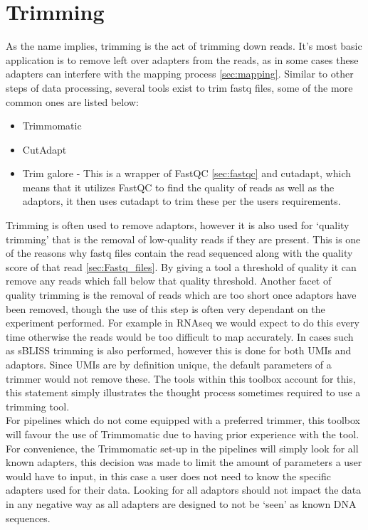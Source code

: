 \label{chap:tools}

\section{Trimming \label{sec:trimming}}
As the name implies, trimming is the act of trimming down reads. It's most basic application is to remove left over adapters from the reads, as in some cases these adapters can interfere with the mapping process \autoref{sec:mapping}. Similar to other steps of data processing, several tools exist to trim fastq files, some of the more common ones are listed below:\\
\begin{itemize}
\item Trimmomatic \cite{bolger2014trimmomatic}
\item CutAdapt \cite{martin2011cutadapt}
\item Trim galore \cite{krueger2015trim} - This is a wrapper of FastQC \autoref{sec:fastqc} and cutadapt, which means that it utilizes FastQC to find the quality of reads as well as the adaptors, it then uses cutadapt to trim these per the users requirements.
\end{itemize}
Trimming is often used to remove adaptors, however it is also used for `quality trimming' that is the removal of low-quality reads if they are present. This is one of the reasons why fastq files contain the read sequenced along with the quality score of that read \autoref{sec:Fastq_files}. By giving a tool a threshold of quality it can remove any reads which fall below that quality threshold. Another facet of quality trimming is the removal of reads which are too short once adaptors have been removed, though the use of this step is often very dependant on the experiment performed. For example in RNAseq we would expect to do this every time otherwise the reads would be too difficult to map accurately. In cases such as 
sBLISS trimming is also performed, however this is done for both UMIs and adaptors. Since UMIs are by definition unique, the default parameters of a trimmer would not remove these. The tools within this toolbox account for this, this statement simply illustrates the thought process sometimes required to use a trimming tool.\\
For pipelines which do not come equipped with a preferred trimmer, this toolbox will favour the use of Trimmomatic due to having prior experience with the tool. For convenience, the Trimmomatic set-up in the pipelines will simply look for all known adapters, this decision was made to limit the amount of parameters a user would have to input, in this case a user does not need to know the specific adapters used for their data. Looking for all adaptors should not impact the data in any negative way as all adapters are designed to not be `seen' as known DNA sequences.

